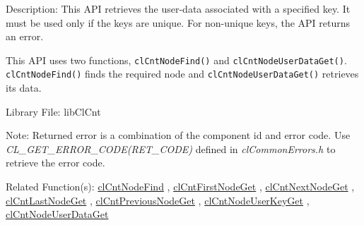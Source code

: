 \begin{Desc}
\item[Description:]This API retrieves the user-data associated with a specified key. It must be used only if the keys are unique. For 
non-unique keys, the API returns an error. 
\par 
This API uses two functions, {\tt{clCntNodeFind()}} and {\tt{clCntNodeUserDataGet()}}. {\tt{clCntNodeFind()}} finds the required node and 
{\tt{clCntNodeUserDataGet()}} retrieves its data.

\end{Desc}
\begin{Desc}
\item[Library File:]lib\-Cl\-Cnt\end{Desc}
\begin{Desc}
\item[Note:]Returned error is a combination of the component id and error code. Use \textit{CL\_\-GET\_\-ERROR\_\-CODE(RET\_\-CODE)} defined in \textit{clCommonErrors.h} to retrieve the error code.\end{Desc}
\begin{Desc}
\item[Related Function(s):]\hyperlink{pagecnt109}{cl\-Cnt\-Node\-Find} , \hyperlink{pagecnt110}{cl\-Cnt\-First\-Node\-Get} , 
\hyperlink{pagecnt112}{cl\-Cnt\-Next\-Node\-Get} , \hyperlink{pagecnt111}{cl\-Cnt\-Last\-Node\-Get} , 
\hyperlink{pagecnt113}{cl\-Cnt\-Previous\-Node\-Get} , \hyperlink{pagecnt115}{cl\-Cnt\-Node\-User\-Key\-Get} , 
\hyperlink{pagecnt117}{cl\-Cnt\-Node\-User\-Data\-Get} \end{Desc}


\newpage
